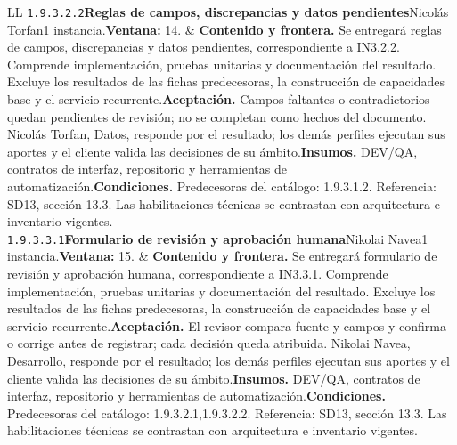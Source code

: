 \begin{longtable}{L{\tabcolsep\relax}L{\tabcolsep\relax}}
\texttt{1.\allowbreak{}9.\allowbreak{}3.\allowbreak{}2.\allowbreak{}2}\newline{}\textbf{Reglas de campos, discrepancias y datos pendientes}\newline{}Nicolás Torfan\newline{}1 instancia.\newline{}\textbf{Ventana:} 14. & \textbf{Contenido y frontera.} Se entregará reglas de campos, discrepancias y datos pendientes, correspondiente a IN3.2.2. Comprende implementación, pruebas unitarias y documentación del resultado. Excluye los resultados de las fichas predecesoras, la construcción de capacidades base y el servicio recurrente.\newline{}\textbf{Aceptación.} Campos faltantes o contradictorios quedan pendientes de revisión; no se completan como hechos del documento. Nicolás Torfan, Datos, responde por el resultado; los demás perfiles ejecutan sus aportes y el cliente valida las decisiones de su ámbito.\newline{}\textbf{Insumos.} DEV/QA, contratos de interfaz, repositorio y herramientas de automatización.\newline{}\textbf{Condiciones.} Predecesoras del catálogo: 1.9.3.1.2. Referencia: SD13, sección 13.3. Las habilitaciones técnicas se contrastan con arquitectura e inventario vigentes.\\\hline
\texttt{1.\allowbreak{}9.\allowbreak{}3.\allowbreak{}3.\allowbreak{}1}\newline{}\textbf{Formulario de revisión y aprobación humana}\newline{}Nikolai Navea\newline{}1 instancia.\newline{}\textbf{Ventana:} 15. & \textbf{Contenido y frontera.} Se entregará formulario de revisión y aprobación humana, correspondiente a IN3.3.1. Comprende implementación, pruebas unitarias y documentación del resultado. Excluye los resultados de las fichas predecesoras, la construcción de capacidades base y el servicio recurrente.\newline{}\textbf{Aceptación.} El revisor compara fuente y campos y confirma o corrige antes de registrar; cada decisión queda atribuida. Nikolai Navea, Desarrollo, responde por el resultado; los demás perfiles ejecutan sus aportes y el cliente valida las decisiones de su ámbito.\newline{}\textbf{Insumos.} DEV/QA, contratos de interfaz, repositorio y herramientas de automatización.\newline{}\textbf{Condiciones.} Predecesoras del catálogo: 1.9.3.2.1,1.9.3.2.2. Referencia: SD13, sección 13.3. Las habilitaciones técnicas se contrastan con arquitectura e inventario vigentes.\\\hline

\end{longtable}
